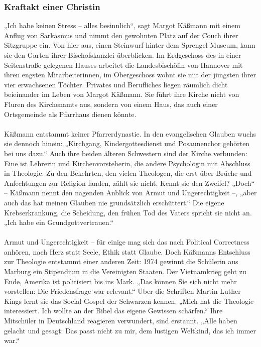 \documentclass[a4paper,12pt,oneside]{scrbook}
\begin{document}
\subsubsection{Kraftakt einer Christin}
„Ich habe keinen Stress – alles besinnlich“, sagt Margot Käßmann mit einem Anflug von Sarkasmus und nimmt den gewohnten Platz auf der Couch ihrer Sitzgruppe ein. Von hier aus, einen Steinwurf hinter dem Sprengel Museum, kann sie den Garten ihrer Bischofskanzlei überblicken. Im Erdgeschoss des in einer Seitenstraße gelegenen Hauses arbeitet die Landesbischöfin von Hannover mit ihren engsten Mitarbeiterinnen, im Obergeschoss wohnt sie mit der jüngsten ihrer vier erwachsenen Töchter. Privates und Berufliches liegen räumlich dicht beieinander im Leben von Margot Käßmann. Sie führt ihre Kirche nicht von Fluren des Kirchenamts aus, sondern von einem Haus, das auch einer Ortsgemeinde als Pfarrhaus dienen könnte.
\\\\
Käßmann entstammt keiner Pfarrerdynastie. In den evangelischen Glauben wuchs sie dennoch hinein: „Kirchgang, Kindergottesdienst und Posaunenchor gehörten bei uns dazu.“ Auch ihre beiden älteren Schwestern sind der Kirche verbunden: Eine ist Lehrerin und Kirchenvorsteherin, die andere Psychologin mit Abschluss in Theologie. Zu den Bekehrten, den vielen Theologen, die erst über Brüche und Anfechtungen zur Religion fanden, zählt sie nicht. Kennt sie den Zweifel? „Doch“ – Käßmann nennt den nagenden Anblick von Armut und Ungerechtigkeit –, „aber auch das hat meinen Glauben nie grundsätzlich erschüttert.“ Die eigene Krebserkrankung, die Scheidung, den frühen Tod des Vaters spricht sie nicht an. „Ich habe ein Grundgottvertrauen.“
\\\\
Armut und Ungerechtigkeit – für einige mag sich das nach Political Correctness anhören, nach Herz statt Seele, Ethik statt Glaube. Doch Käßmanns Entschluss zur Theologie entstammt einer anderen Zeit: 1974 gewinnt die Schülerin aus Marburg ein Stipendium in die Vereinigten Staaten. Der Vietnamkrieg geht zu Ende, Amerika ist politisiert bis ins Mark. „Das können Sie sich nicht mehr vorstellen: Die Friedensfrage war relevant.“ Über die Schriften Martin Luther Kings lernt sie das Social Gospel der Schwarzen kennen. „Mich hat die Theologie interessiert. Ich wollte an der Bibel das eigene Gewissen schärfen.“ Ihre Mitschüler in Deutschland reagieren verwundert, sind erstaunt. „Alle haben gelacht und gesagt: Das passt nicht zu mir, dem lustigen Weltkind, das ich immer war.“
\end{document}
